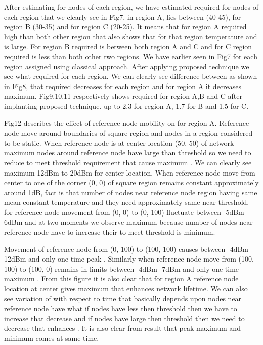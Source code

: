 \documentclass[12pt, conference, compsocconf, onecolumn, draftcls]{IEEEtran}
\begin{document}
After estimating  for nodes of each region, we have estimated required  for nodes of each region that we clearly see in Fig7, in region A,  lies between (40-45), for region B (30-35) and for region C (20-25). It means that for region A required  high than both other region that also shows that for that region temperature and  is large. For region B required  is between both region A and C and for C region required  is less than both other two regions. We have earlier seen in Fig7  for each region assigned using classical approach. After applying proposed technique we see what  required for each region. We can clearly see difference  between  as shown in Fig8, that required  decreases for each region and for region A it decreases maximum. Fig9,10,11 respectively  shows required  for region A,B and C after implanting proposed technique.  up to 2.3 for region A, 1.7 for B and 1.5 for C.

Fig12 describes the effect of reference node mobility on  for region A.   Reference node move around boundaries of  square region and nodes in a region  considered to be static. When reference node is at center location (50, 50) of network maximum nodes around reference node have large  than threshold so we need to reduce  to meet threshold  requirement that cause maximum .  We can clearly see maximum  12dBm to 20dBm for center location.  When reference  node move  from center to one of  the corner (0, 0) of square region  remains constant approximately around 1dB, fact is that number of nodes near reference node region having same  mean constant temperature and they need approximately same  near threshold.  for reference node movement from (0, 0) to (0, 100) fluctuate between -5dBm - 6dBm and at two moments we observe maximum  because number of nodes near reference node have to increase their  to meet threshold is minimum.

Movement of reference node from (0, 100) to (100, 100) causes  between -4dBm - 12dBm and only one time peak . Similarly when reference node move from (100, 100) to (100, 0)  remains in limits between -4dBm- 7dBm and only one time maximum  . From this figure it is also clear that for region A reference node location at center gives maximum  that enhances network lifetime. We can also see variation of  with respect to time that basically depends upon nodes near reference node have what  if nodes have less  then threshold then we have to increase  that decrease  and if nodes have large  then threshold then we need to decrease  that enhances . It is also clear from result that peak maximum and minimum  comes at same time.
\end{document}
